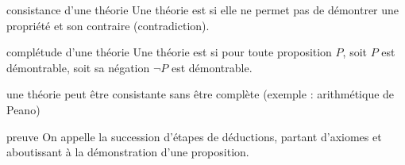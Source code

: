 \begin{definition}{}{consistance d'une théorie}
    Une théorie est  si elle ne permet pas de démontrer une propriété et son contraire (contradiction).
\end{definition}

\begin{definition}{}{complétude d'une théorie}
    Une théorie est  si pour toute proposition $P$, soit $P$ est démontrable, soit sa négation $\neg P$ est démontrable.
\end{definition}


\begin{remarque}{}{}
    une théorie peut être consistante sans être complète (exemple : arithmétique de Peano)
\end{remarque}

\begin{definition}{}{preuve}
    On appelle  la succession d'étapes de déductions, partant d'axiomes et aboutissant à la démonstration d'une proposition.
\end{definition}






